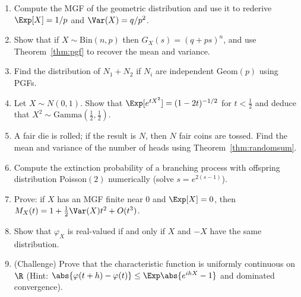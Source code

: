 \begin{enumerate}
\item Compute the MGF of the geometric distribution and use it to rederive
$\Exp[X]=1/p$ and $\Var(X)=q/p^2$.
\item Show that if $X\sim\mathrm{Bin}(n,p)$ then $G_X(s)=(q+ps)^n$, and use
Theorem~\ref{thm:pgf} to recover the mean and variance.
\item Find the distribution of $N_1+N_2$ if $N_i$ are independent Geom$(p)$ using
PGFs.
\item Let $X\sim N(0,1)$. Show that $\Exp[e^{tX^2}]=(1-2t)^{-1/2}$ for $t<\frac12$ and
deduce that $X^2\sim\mathrm{Gamma}(\tfrac12,\tfrac12)$.
\item A fair die is rolled; if the result is $N$, then $N$ fair coins are tossed.
Find the mean and variance of the number of heads using
Theorem~\ref{thm:randomsum}.
\item Compute the extinction probability of a branching process with offspring
distribution Poisson$(2)$ numerically (solve $s=e^{2(s-1)}$).
\item Prove: if $X$ has an MGF finite near $0$ and $\Exp[X]=0$, then
$M_X(t)=1+\tfrac12\Var(X)t^2+O(t^3)$.
\item Show that $\varphi_X$ is real-valued if and only if $X$ and $-X$ have the same
distribution.
\item (Challenge) Prove that the characteristic function is uniformly continuous
on $\R$ (Hint: $\abs{\varphi(t+h)-\varphi(t)}\le\Exp\abs{e^{ihX}-1}$ and
dominated convergence).
\end{enumerate}
